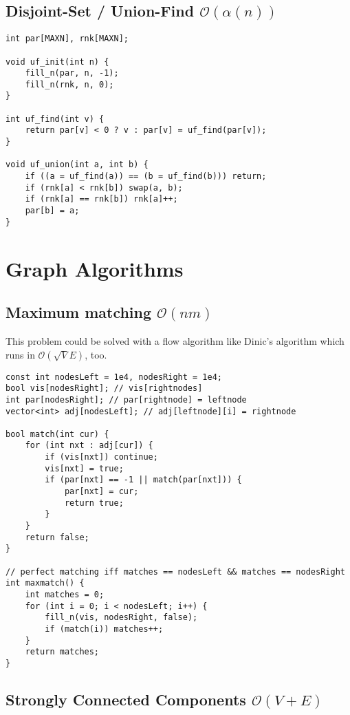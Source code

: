 \documentclass{article}
\begin{document}
\subsection{Disjoint-Set / Union-Find $\mathcal{O}(\alpha (n))$}

\begin{lstlisting}
int par[MAXN], rnk[MAXN];

void uf_init(int n) {
	fill_n(par, n, -1);
	fill_n(rnk, n, 0);
}

int uf_find(int v) {
	return par[v] < 0 ? v : par[v] = uf_find(par[v]);
}

void uf_union(int a, int b) {
	if ((a = uf_find(a)) == (b = uf_find(b))) return;
	if (rnk[a] < rnk[b]) swap(a, b);
	if (rnk[a] == rnk[b]) rnk[a]++;
	par[b] = a;
}
\end{lstlisting}

\section{Graph Algorithms}
\subsection{Maximum matching $\mathcal{O}(n m)$}

This problem could be solved with a flow algorithm like Dinic's algorithm which runs in $\mathcal{O} (\sqrt{V} E)$, too.

\begin{lstlisting}
const int nodesLeft = 1e4, nodesRight = 1e4;
bool vis[nodesRight]; // vis[rightnodes]
int par[nodesRight]; // par[rightnode] = leftnode
vector<int> adj[nodesLeft]; // adj[leftnode][i] = rightnode

bool match(int cur) {
	for (int nxt : adj[cur]) {
		if (vis[nxt]) continue;
		vis[nxt] = true;
		if (par[nxt] == -1 || match(par[nxt])) {
			par[nxt] = cur;
			return true;
		}
	}
	return false;
}

// perfect matching iff matches == nodesLeft && matches == nodesRight
int maxmatch() {
	int matches = 0;
	for (int i = 0; i < nodesLeft; i++) {
		fill_n(vis, nodesRight, false);
		if (match(i)) matches++;
	}
	return matches;
}
\end{lstlisting}

\subsection{Strongly Connected Components $\mathcal{O}(V + E)$}
\end{document}
